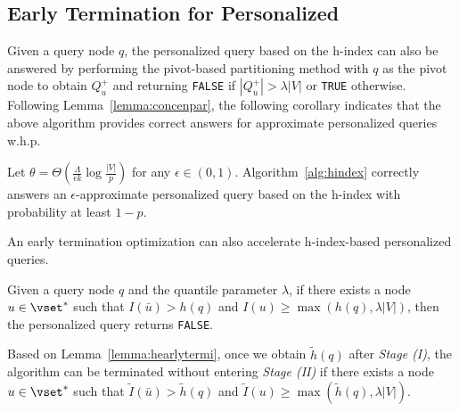 \subsection{Early Termination for Personalized \ced}
\label{sec:hindex-personal}

Given a query node $q$, the personalized \ced query based on the h-index can also be answered by performing the pivot-based partitioning method with $q$ as the pivot node to obtain $Q^+_u$ and returning \texttt{FALSE} if $|Q^+_u| > \lambda|V|$ or \texttt{TRUE} otherwise.
Following Lemma~\ref{lemma:concenpar}, the following corollary indicates that the above algorithm provides correct answers for approximate personalized \ced queries w.h.p.
\begin{corollary}
  Let $\theta = \Theta(\frac{\Lambda}{\epsilon k} \log{\frac{|V|}{p}})$ for any $\epsilon\in(0,1)$. Algorithm~\ref{alg:hindex} correctly answers an $\epsilon$-approximate personalized \ced query based on the h-index with probability at least $1 - p$.
\end{corollary}

An early termination optimization can also accelerate h-index-based personalized \ced queries.
\begin{lemma}\label{lemma:hearlytermi}
  Given a query node $q$ and the quantile parameter $\lambda$, if there exists a node $u \in \vset^*$ such that $I(\bar{u}) > h(q)$ and $I(u) \geq \max(h(q), \lambda|V|)$, then the personalized \ced query returns \texttt{FALSE}.
\end{lemma}


Based on Lemma~\ref{lemma:hearlytermi}, 
once we obtain $\widetilde{h}(q)$ after \emph{Stage (I)}, the algorithm can be terminated without entering \emph{Stage (II)} if there exists a node $u \in \vset^*$ such that $\widetilde{I}(\bar{u}) > \widetilde{h}(q)$ and $\widetilde{I}(u) \geq \max(\widetilde{h}(q), \lambda|V|)$.

